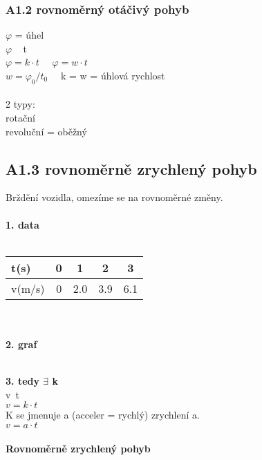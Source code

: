 \documentclass{article}
\begin{document}
\subsubsection*{A1.2 rovnoměrný otáčivý pohyb}
$\varphi$ = úhel\\
$\varphi$ ~ t\\
$\varphi = k \cdot t \quad$ $\varphi = w \cdot t$\\
$w = \varphi_0 / t_0 \quad$ k = w = úhlová rychlost\\\\
2 typy:\\
rotační\\
revoluční = oběžný\\

\subsection{A1.3 rovnoměrně zrychlený pohyb}
Brždění vozidla, omezíme se na rovnoměrné změny.\\\\
\textbf{1. data}\\\\
\begin{tabular}{|l|c|c|c|c|}
\hline
    t(s) & 0 & 1 & 2 & 3\\
\hline
    v(m/s) & 0 & 2.0 & 3.9 & 6.1\\
\hline
\end{tabular}\\\\
\textbf{2. graf}\\
\\
\textbf{3. tedy $\exists$ k}\\
v~t\\
$v = k \cdot t$\\
K se jmenuje a (acceler = rychlý) zrychlení a.\\
$v = a \cdot t$\\\\
\textbf{Rovnoměrně zrychlený pohyb}
\end{document}
